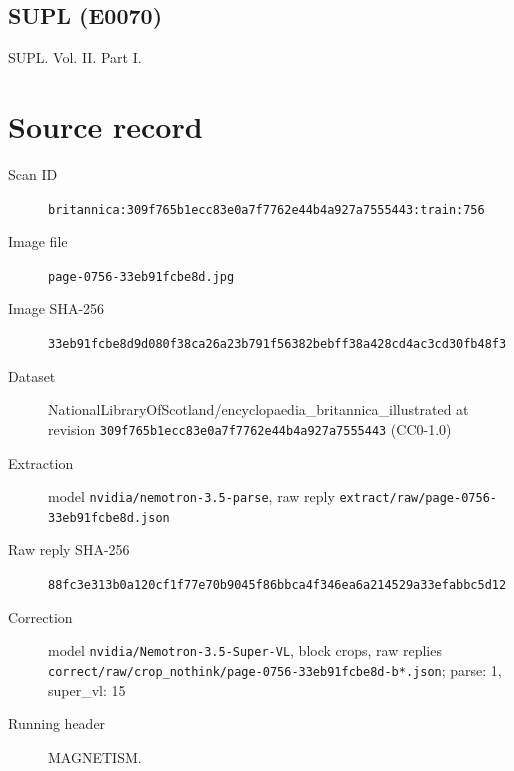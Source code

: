 \documentclass{article}
\begin{document}
\subsection*{SUPL (E0070)}
SUPL. Vol. II. Part I.


\section*{Source record}
\begin{description}
\item[Scan ID] \texttt{britannica:309f765b1ecc83e0a7f7762e44b4a927a7555443:train:756}
\item[Image file] \texttt{page-0756-33eb91fcbe8d.jpg}
\item[Image SHA-256] \texttt{33eb91fcbe8d9d080f38ca26a23b791f56382bebff38a428cd4ac3cd30fb48f3}
\item[Dataset] NationalLibraryOfScotland/encyclopaedia\_britannica\_illustrated at revision \texttt{309f765b1ecc83e0a7f7762e44b4a927a7555443} (CC0-1.0)
\item[Extraction] model \texttt{nvidia/nemotron-3.5-parse}, raw reply \texttt{extract/raw/page-0756-33eb91fcbe8d.json}
\item[Raw reply SHA-256] \texttt{88fc3e313b0a120cf1f77e70b9045f86bbca4f346ea6a214529a33efabbc5d12}
\item[Correction] model \texttt{nvidia/Nemotron-3.5-Super-VL}, block crops, raw replies \texttt{correct/raw/crop\_nothink/page-0756-33eb91fcbe8d-b*.json}; parse: 1, super\_vl: 15
\item[Running header] MAGNETISM.
\end{description}
\end{document}
